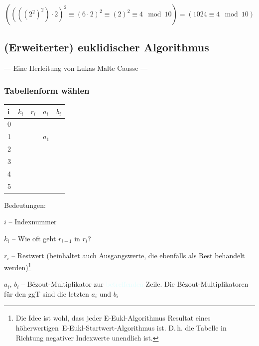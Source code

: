 \documentclass{scrartcl}
\begin{document}
\begin{equation}
	\left(
	\left(\left(\left(2^2\right)^2\right)\cdot 2\right)^2 \equiv 
	\left(                    6          \cdot 2\right)^2 \equiv
	\left(                    2                 \right)^2 \equiv
	4 \mod 10
	\right) = \left(
	1024 \equiv 4 \mod 10
	\right)
\end{equation}

\subsection{(Erweiterter) euklidischer Algorithmus}

\label{euklidalgo}

{\hfill --- Eine Herleitung von Lukas Malte Causse ---\hfill}

\subsubsection{Tabellenform wählen}

\begin{table}[h!]
	\begin{tabular}{|l|l|l|l|l|}
		\hline
		i & $k_i$ & $r_i$ & $a_i$ & $b_i$ \\ \hline
		0 &       &       &       &       \\ \hline
		\rowcolor{LightCyan}
		1 &       &       & $a_1$ &       \\ \hline
		2 &       &       &       &       \\ \hline
		3 &       &       &       &       \\ \hline
		4 &       &       &       &       \\ \hline
		5 &       &       &       &       \\ \hline
	\end{tabular}
\end{table}

Bedeutungen: 

$i$ -- Indexnummer

$k_i$ -- Wie oft geht $r_{i + 1}$ in $r_i$?

$r_i$ -- Restwert (beinhaltet auch Ausgangswerte, die ebenfalls als Rest behandelt 
werden)\footnote{Die Idee ist wohl, dass jeder E-Eukl-Algorithmus Resultat eines \frq höherwertigen\flq\ E-Eukl-Startwert-Algorithmus ist. D.\,h. die Tabelle in Richtung
negativer Indexwerte unendlich ist.}

$a_i$, $b_i$ -- Bézout-Multiplikator zur \textcolor{LightCyan}{betreffenden} Zeile. Die Bézout-Multiplikatoren für den ggT sind die letzten $a_i$ und $b_i$
\end{document}
